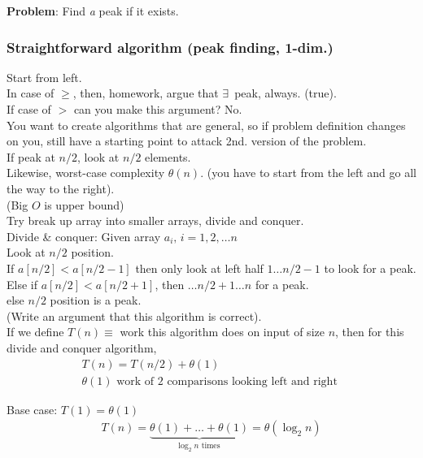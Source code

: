 \documentclass[10pt]{amsart}
\begin{document}
\textbf{Problem}: Find \emph{a} peak if it exists. \\

\subsubsection{Straightforward algorithm (peak finding, 1-dim.)}

Start from left. \\

In case of $\geq$, then, homework, argue that $\exists \,$ peak, always. (true). \\
If case of $>$ can you make this argument? No. \\

You want to create algorithms that are general, so if problem definition changes on you, still have a starting point to attack 2nd. version of the problem.\\

If peak at $n/2$, look at $n/2$ elements. \\
Likewise, worst-case complexity $\theta(n)$. (you have to start from the left and go all the way to the right). \\
(Big $O$ is upper bound) \\

Try break up array into smaller arrays, divide and conquer. \\
Divide \& conquer: Given array $a_i, \, i = 1, 2, \dots n$ \\
Look at $n/2$ position. \\
If $a[n/2] < a[n/2 - 1]$ then only look at left half $1\dots n/2 - 1$ to look for a peak. \\
Else if $a[n/2] < a[n/2 + 1]$, then $\dots n/2 + 1 \dots n$ for a peak. \\
else $n/2$ position is a peak. \\
(Write an argument that this algorithm is correct). \\

If we define $T(n) \equiv$ work this algorithm does on input of size $n$, then for this divide and conquer algorithm, 
\[
\begin{gathered}
T(n) = T(n/2) + \theta(1) \\
\theta(1) \text{ work of 2 comparisons looking left and right }
\end{gathered}
\]

Base case: $T(1) = \theta(1)$
\[
\begin{gathered}
T(n) = \underbrace{\theta(1) + \dots + \theta(1)}_{\log_2{n} \text{ times } } = \theta(\log_2{n})
\end{gathered}
\]
\end{document}
